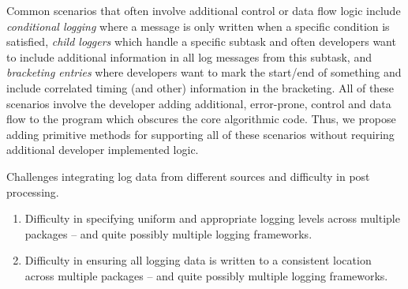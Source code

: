 Common scenarios that often involve additional control or data flow logic 
include \emph{conditional logging} where a message is only written when a 
specific condition is satisfied, \emph{child loggers} which handle a specific 
subtask and often developers want to include additional information in all 
log messages from this subtask, and \emph{bracketing entries} where 
developers want to mark the start/end of something and include correlated 
timing (and other) information in the bracketing. All of these scenarios 
involve the developer adding additional, error-prone, control and data flow 
to the program which obscures the core algorithmic code. Thus, we propose 
adding primitive methods for supporting all of these scenarios without requiring 
additional developer implemented logic.

\noindent
Challenges integrating log data from different sources and difficulty in post processing.
\begin{enumerate}
\item Difficulty in specifying uniform and appropriate logging levels across 
    multiple packages -- and quite possibly multiple logging frameworks.
\item Difficulty in ensuring all logging data is written to a consistent location 
    across multiple packages -- and quite possibly multiple logging frameworks.
\end{enumerate}

